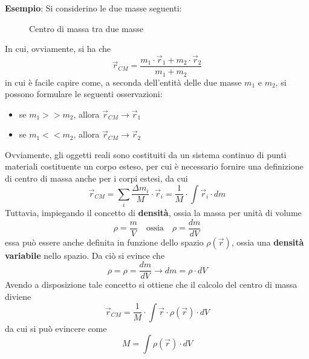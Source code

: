 \documentclass[a4paper]{extarticle}
\begin{document}
\vspace{1em}
\noindent
\textbf{Esempio}: Si considerino le due masse seguenti:

\vspace{1em}
\begin{figure}[H]
  \centering
  \caption{Centro di massa tra due masse}
  \label{fig:centro_di_massa}
\end{figure}

\vspace{1em}
\noindent
In cui, ovviamente, si ha che
\[\vec r_{CM} = \frac{m_1 \cdot \vec r_1 + m_2 \cdot \vec r_2}{m_1 + m_2}\]
in cui è facile capire come, a seconda dell'entità delle due masse $m_1$ e $m_2$, si possono formulare le seguenti osservazioni:
\begin{itemize}
  \item se $m_1 >> m_2$, allora $\vec r_{CM} \to \vec r_1$
  \item se $m_1 << m_2$, allora $\vec r_{CM} \to \vec r_2$
\end{itemize}

\vspace{1em}
\noindent
Ovviamente, gli oggetti reali sono costituiti da un sistema continuo di punti materiali costituente un corpo esteso, per cui è necessario fornire una definizione di centro di massa anche per i corpi estesi, da cui
\[\boxed{\vec r_{CM} = \sum_{i} \frac{\Delta m_i}{M} \cdot \vec r_i = \frac{1}{M} \cdot \int \vec r_i \cdot dm}\]
Tuttavia, impiegando il concetto di \textbf{densità}, ossia la massa per unità di volume
\[\rho = \frac{m}{V} \hspace{1em} \text{ossia} \hspace{1em} \rho = \frac{dm}{dV}\]
essa può essere anche definita in funzione dello spazio $\rho(\vec r)$, ossia una \textbf{densità variabile} nello spazio. Da ciò si evince che
\[\rho = \rho = \frac{dm}{dV} \longrightarrow dm = \rho \cdot dV\]
Avendo a disposizione tale concetto si ottiene che il calcolo del centro di massa diviene
\[\boxed{\vec r_{CM} = \frac{1}{M} \cdot \int \vec r \cdot \rho(\vec r) \cdot dV}\]
da cui si può evincere come
\[M=\int \rho(\vec r) \cdot dV\]
\end{document}
